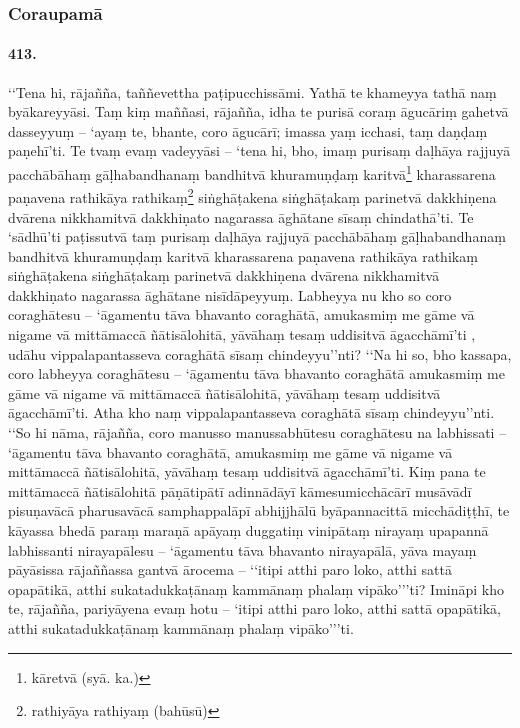 \subsubsection{Coraupamā}

\paragraph{413.} ‘‘Tena hi, rājañña, taññevettha paṭipucchissāmi. Yathā te khameyya tathā naṃ byākareyyāsi. Taṃ kiṃ maññasi, rājañña, idha te purisā coraṃ āgucāriṃ gahetvā dasseyyuṃ – ‘ayaṃ te, bhante, coro āgucārī; imassa yaṃ icchasi, taṃ daṇḍaṃ paṇehī’ti. Te tvaṃ evaṃ vadeyyāsi – ‘tena hi, bho, imaṃ purisaṃ daḷhāya rajjuyā pacchābāhaṃ gāḷhabandhanaṃ bandhitvā khuramuṇḍaṃ karitvā\footnote{kāretvā (syā. ka.)} kharassarena paṇavena rathikāya rathikaṃ\footnote{rathiyāya rathiyaṃ (bahūsū)} siṅghāṭakena siṅghāṭakaṃ parinetvā dakkhiṇena dvārena nikkhamitvā dakkhiṇato nagarassa āghātane sīsaṃ chindathā’ti. Te ‘sādhū’ti paṭissutvā taṃ purisaṃ daḷhāya rajjuyā pacchābāhaṃ gāḷhabandhanaṃ bandhitvā khuramuṇḍaṃ karitvā kharassarena paṇavena rathikāya rathikaṃ siṅghāṭakena siṅghāṭakaṃ parinetvā dakkhiṇena dvārena nikkhamitvā dakkhiṇato nagarassa āghātane nisīdāpeyyuṃ. Labheyya nu kho so coro coraghātesu – ‘āgamentu tāva bhavanto coraghātā, amukasmiṃ me gāme vā nigame vā mittāmaccā ñātisālohitā, yāvāhaṃ tesaṃ uddisitvā āgacchāmī’ti , udāhu vippalapantasseva coraghātā sīsaṃ chindeyyu’’nti? ‘‘Na hi so, bho kassapa, coro labheyya coraghātesu – ‘āgamentu tāva bhavanto coraghātā amukasmiṃ me gāme vā nigame vā mittāmaccā ñātisālohitā, yāvāhaṃ tesaṃ uddisitvā āgacchāmī’ti. Atha kho naṃ vippalapantasseva coraghātā sīsaṃ chindeyyu’’nti. ‘‘So hi nāma, rājañña, coro manusso manussabhūtesu coraghātesu na labhissati – ‘āgamentu tāva bhavanto coraghātā, amukasmiṃ me gāme vā nigame vā mittāmaccā ñātisālohitā, yāvāhaṃ tesaṃ uddisitvā āgacchāmī’ti. Kiṃ pana te mittāmaccā ñātisālohitā pāṇātipātī adinnādāyī kāmesumicchācārī musāvādī pisuṇavācā pharusavācā samphappalāpī abhijjhālū byāpannacittā micchādiṭṭhī, te kāyassa bhedā paraṃ maraṇā apāyaṃ duggatiṃ vinipātaṃ nirayaṃ upapannā labhissanti nirayapālesu – ‘āgamentu tāva bhavanto nirayapālā, yāva mayaṃ pāyāsissa rājaññassa gantvā ārocema – ‘‘itipi atthi paro loko, atthi sattā opapātikā, atthi sukatadukkaṭānaṃ kammānaṃ phalaṃ vipāko’’’ti? Imināpi kho te, rājañña, pariyāyena evaṃ hotu – ‘itipi atthi paro loko, atthi sattā opapātikā, atthi sukatadukkaṭānaṃ kammānaṃ phalaṃ vipāko’’’ti.

